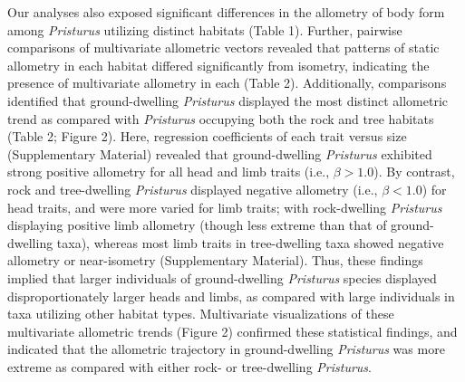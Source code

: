 \documentclass[
  11pt,
]{article}
\begin{document}
Our analyses also exposed significant differences in the allometry of
body form among \emph{Pristurus} utilizing distinct habitats (Table 1).
Further, pairwise comparisons of multivariate allometric vectors
revealed that patterns of static allometry in each habitat differed
significantly from isometry, indicating the presence of multivariate
allometry in each (Table 2). Additionally, comparisons identified that
ground-dwelling \emph{Pristurus} displayed the most distinct allometric
trend as compared with \emph{Pristurus} occupying both the rock and tree
habitats (Table 2; Figure 2). Here, regression coefficients of each
trait versus size (Supplementary Material) revealed that ground-dwelling
\emph{Pristurus} exhibited strong positive allometry for all head and
limb traits (i.e., \(\beta>1.0\)). By contrast, rock and tree-dwelling
\emph{Pristurus} displayed negative allometry (i.e., \(\beta < 1.0\))
for head traits, and were more varied for limb traits; with
rock-dwelling \emph{Pristurus} displaying positive limb allometry
(though less extreme than that of ground-dwelling taxa), whereas most
limb traits in tree-dwelling taxa showed negative allometry or
near-isometry (Supplementary Material). Thus, these findings implied
that larger individuals of ground-dwelling \emph{Pristurus} species
displayed disproportionately larger heads and limbs, as compared with
large individuals in taxa utilizing other habitat types. Multivariate
visualizations of these multivariate allometric trends (Figure 2)
confirmed these statistical findings, and indicated that the allometric
trajectory in ground-dwelling \emph{Pristurus} was more extreme as
compared with either rock- or tree-dwelling \emph{Pristurus}.
\hfill\break
\end{document}
